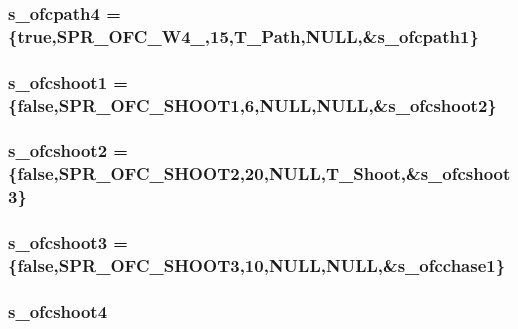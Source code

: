 \label{WL__ACT2_8C_a6601566ef7b73539b95e3bdc9d8de72f}
\hypertarget{WL__ACT2_8C_a3b37f3a468ab697ce571f0ec399c8386}{
\subsubsection[{s\_\-ofcpath4}]{ {\bf s\_\-ofcpath4} = \{true,SPR\_\-OFC\_\-W4\_,15,T\_\-Path,NULL,\&{\bf s\_\-ofcpath1}\}}}
\label{WL__ACT2_8C_a3b37f3a468ab697ce571f0ec399c8386}
\hypertarget{WL__ACT2_8C_a5423e1b82c361ca71a288cbd7b071c1a}{
\subsubsection[{s\_\-ofcshoot1}]{ {\bf s\_\-ofcshoot1} = \{false,SPR\_\-OFC\_\-SHOOT1,6,NULL,NULL,\&{\bf s\_\-ofcshoot2}\}}}
\label{WL__ACT2_8C_a5423e1b82c361ca71a288cbd7b071c1a}
\hypertarget{WL__ACT2_8C_a8df7d062c99ab885343b17ebcc53df1b}{
\subsubsection[{s\_\-ofcshoot2}]{ {\bf s\_\-ofcshoot2} = \{false,SPR\_\-OFC\_\-SHOOT2,20,NULL,T\_\-Shoot,\&{\bf s\_\-ofcshoot3}\}}}
\label{WL__ACT2_8C_a8df7d062c99ab885343b17ebcc53df1b}
\hypertarget{WL__ACT2_8C_aa6111d890bf4a25175072559ff7afc10}{
\subsubsection[{s\_\-ofcshoot3}]{ {\bf s\_\-ofcshoot3} = \{false,SPR\_\-OFC\_\-SHOOT3,10,NULL,NULL,\&{\bf s\_\-ofcchase1}\}}}
\label{WL__ACT2_8C_aa6111d890bf4a25175072559ff7afc10}
\hypertarget{WL__ACT2_8C_a2b74b635952f4ea01434ed28815857ee}{
\subsubsection[{s\_\-ofcshoot4}]{ {\bf s\_\-ofcshoot4}}}
